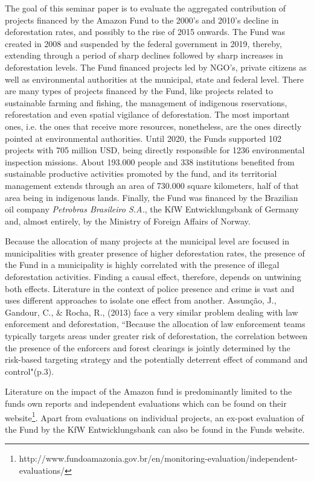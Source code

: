 \documentclass[11pt, oneside]{article}   	%
\begin{document}
The goal of this seminar paper is to evaluate the aggregated contribution of projects financed by the Amazon Fund to the 2000's and 2010's decline in deforestation rates, and possibly to the rise of 2015 onwards. The Fund was created in 2008 and suspended by the federal government in 2019, thereby, extending through a period of sharp declines followed by sharp increases in deforestation levels. The Fund financed projects led by NGO's, private citizens as well as environmental authorities at the municipal, state and federal level. There are many types of projects financed by the Fund, like projects related to sustainable farming and fishing, the management of indigenous reservations, reforestation and even spatial vigilance of deforestation. The most important ones, i.e. the ones that receive more resources, nonetheless, are the ones directly pointed at environmental authorities. Until 2020, the Funds supported 102 projects with 705 million USD, being directly responsible for 1236 environmental inspection missions. About 193.000 people and 338 institutions benefited from sustainable productive activities promoted by the fund, and its territorial management extends through an area of 730.000 square kilometers, half of that area being in indigenous lands. Finally, the Fund was financed by the Brazilian oil company \textit{Petrobras Brasileiro S.A.}, the KfW Entwicklungsbank of Germany and, almost entirely, by the Ministry of Foreign Affairs of Norway.


Because the allocation of many projects at the municipal level are focused in municipalities with greater presence of higher deforestation rates, the presence of the Fund in a municipality is highly correlated with the presence of illegal deforestation activities. Finding a causal effect, therefore, depends on untwining both effects. Literature in the context of police presence and crime is vast and uses different approaches to isolate one effect from another. Assunção, J., Gandour, C., \& Rocha, R., (2013) face a very similar problem dealing with law enforcement and deforestation, ``Because the allocation of law enforcement teams typically targets areas under greater risk of deforestation, the correlation between the presence of the enforcers and forest clearings is jointly determined by the risk-based targeting strategy and the potentially deterrent effect of command and control"(p.3). 

Literature on the impact of the Amazon fund is predominantly limited to the funds own reports and independent evaluations which can be found on their website\footnote{http://www.fundoamazonia.gov.br/en/monitoring-evaluation/independent-evaluations/}. Apart from evaluations on individual projects, an ex-post evaluation of the Fund by the KfW Entwicklungsbank can also be found in the Funds website.
\end{document}
